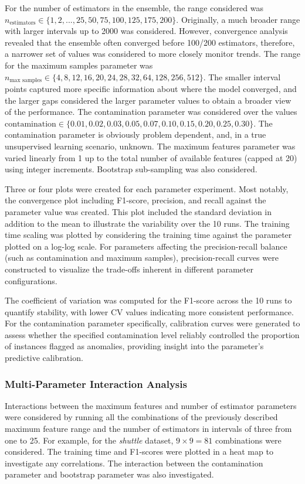 \documentclass[10pt, conference]{IEEEtran}
\begin{document}
For the number of estimators in the ensemble, the range considered was $n_\text{estimators} \in \{1,2,...,25,50,75,100,125,175,200\}$. Originally, a much broader range with larger intervals up to 2000 was considered. However, convergence analysis revealed that the ensemble often converged before 100/200 estimators, therefore, a narrower set of values was considered to more closely monitor trends. The range for the maximum samples parameter was $n_\text{max samples} \in \{4,8,12,16,20,24,28,32,64,128,256, 512\}$. The smaller interval points captured more specific information about where the model converged, and the larger gaps considered the larger parameter values to obtain a broader view of the performance. The contamination parameter was considered over the values $\text{contamination} \in \{0.01, 0.02, 0.03, 0.05, 0.07, 0.10, 0.15, 0.20, 0.25, 0.30\}$. The contamination parameter is obviously problem dependent, and, in a true unsupervised learning scenario, unknown. The maximum features parameter was varied linearly from 1 up to the total number of available features (capped at 20) using integer increments. Bootstrap sub-sampling was also considered.

Three or four plots were created for each parameter experiment. Most notably, the convergence plot including F1-score, precision, and recall against the parameter value was created. This plot included the standard deviation in addition to the mean to illustrate the variability over the 10 runs. The training time scaling was plotted by considering the training time against the parameter plotted on a log-log scale. For parameters affecting the precision-recall balance (such as contamination and maximum samples), precision-recall curves were constructed to visualize the trade-offs inherent in different parameter configurations.

The coefficient of variation was computed for the F1-score across the 10 runs to quantify stability, with lower CV values indicating more consistent performance. For the contamination parameter specifically, calibration curves were generated to assess whether the specified contamination level reliably controlled the proportion of instances flagged as anomalies, providing insight into the parameter's predictive calibration.

\subsubsection{Multi-Parameter Interaction Analysis}
Interactions between the maximum features and number of estimator parameters were considered by running all the combinations of the previously described maximum feature range and the number of estimators in intervals of three from one to 25. For example, for the \textit{shuttle} dataset, $9 \times 9 = 81$ combinations were considered. The training time and F1-scores were plotted in a heat map to investigate any correlations. The interaction between the contamination parameter and bootstrap parameter was also investigated.
\end{document}
